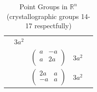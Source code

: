 \documentclass[a4paper,12pt]{amsart}
\begin{document}
\begin{table}[h]
\begin{tabular}{|c|c|c|c|c|}
			&   $3a^2$   &                   \\
			
			
			& & $\begin{pmatrix}
				 a & -a \\        
				a & 2a \\
			\end{pmatrix}$
			
			&  $3a^2$   &            \\
			
			
			& &  $\begin{pmatrix}
				2a & a \\        
				-a & a \\
			\end{pmatrix}$
			
			&   $3a^2$     &                           \\
			
			\hline
			
			
		\end{tabular}
		
		
		
		
		\caption{Point Groups in $\mathbb{R}^n$ (crystallographic groups 14-17 respectfully)}	
	\end{table}

	\newpage
	\thispagestyle {empty}
	
	\begin{appendices}
	\end{appendices}
\end{document}
